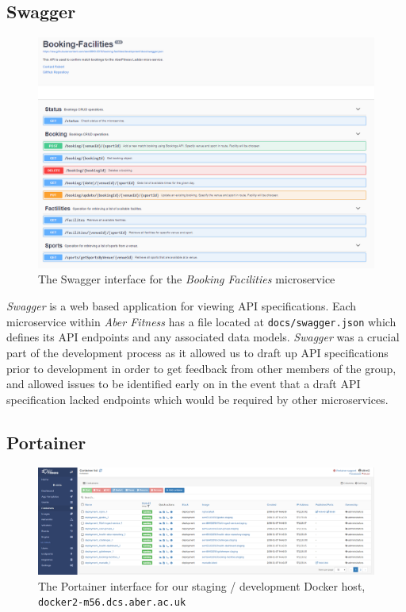 \subsection{Swagger}
\begin{figure}[H]
    \centering
    \includegraphics[width=\textwidth]{Images/Swagger.png}
    \caption{The Swagger interface for the \textit{Booking Facilities} microservice}
\end{figure}

\textit{Swagger} is a web based application for viewing API specifications. Each microservice within \textit{Aber Fitness} has a file located at \lstinline{docs/swagger.json} which defines its API endpoints and any associated data models. \textit{Swagger} was a crucial part of the development process as it allowed us to draft up API specifications prior to development in order to get feedback from other members of the group, and allowed issues to be identified early on in the event that a draft API specification lacked endpoints which would be required by other microservices. 


\subsection{Portainer}
\begin{figure}[H]
    \centering
    \includegraphics[width=\textwidth]{Images/Portainer.png}
    \caption{The Portainer interface for our staging / development Docker host, \lstinline{docker2-m56.dcs.aber.ac.uk}}
\end{figure}

